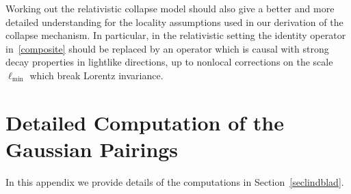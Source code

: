 \documentclass[reqno,11pt]{amsart}
\numberwithin{equation}{section}
\newcommand{\1}{\mathds{1}}
\begin{document}
{Working out the relativistic collapse model should also give
a better and more detailed understanding for the locality assumptions used in
our derivation of the collapse mechanism. In particular, in the relativistic setting
the identity operator in~\eqref{composite} should be replaced by an operator which is causal
with strong decay properties in lightlike directions,
up to nonlocal corrections on the scale~$\ell_{\min}$ which break Lorentz invariance.

\appendix
\section{Detailed Computation of the Gaussian Pairings} \label{applindblad}
In this appendix we provide details of the computations in Section~\ref{seclindblad}.
%
}
\end{document}
